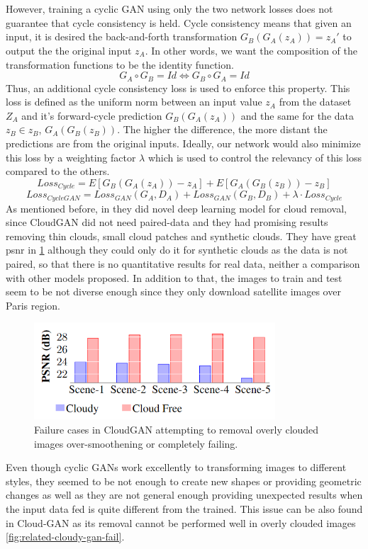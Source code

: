 \documentclass[11pt, a4paper]{article}
\begin{document}
	\\
	\\
	However, training a cyclic GAN using only the two network losses does not guarantee that cycle consistency is held. Cycle consistency means that given an input, it is desired the back-and-forth transformation $G_B(G_A(z_A)) = z_A'$ to output the the original input $z_A$.  In other words, we want the composition of the transformation functions to be the identity function.
	\[G_A \circ G_B = Id \Longleftrightarrow G_B \circ G_A = Id\]
	Thus, an additional cycle consistency loss is used to enforce this property. This loss is defined as the uniform norm between an input value $z_A$ from the dataset $Z_A$ and it's forward-cycle prediction $G_B(G_A(z_A))$ and the same for the data $z_B \in z_B$, $G_A(G_B(z_B))$. The higher the difference, the more distant the predictions are from the original inputs. Ideally, our network would also minimize this loss by a weighting factor $\lambda$ which is used to control the relevancy of this loss compared to the others.
	\[Loss_{Cycle} = E[G_B(G_A(z_A)) - z_A] + E[G_A(G_B(z_B)) - z_B] \] %
	\[Loss_{CycleGAN} = Loss_{GAN}(G_A, D_A) + Loss_{GAN}(G_B, D_B) + \lambda \cdot Loss_{Cycle}\]
	As mentioned before, in \cite{cloud-gan} they did novel deep learning model for cloud removal, since CloudGAN did not need paired-data and they had promising results removing thin clouds, small cloud patches and synthetic clouds. They have great \gls{psnr} in \ref{fig:related-cycle-psnr} although they could only do it for synthetic clouds as the data is not paired, so that there is no quantitative results for real data, neither a comparison with other models proposed. In addition to that, the images to train and test seem to be not diverse enough since they only download satellite images over Paris region.
	\begin{figure}[H]
		\centering
		\includegraphics[width=9cm]{imgs/relatedwork/cycle-gan-psnr.png}
		\caption{Failure cases in CloudGAN attempting to removal overly clouded images over-smoothening or completely failing.}
		\label{fig:related-cycle-psnr}
	\end{figure}
	Even though cyclic GANs work excellently to transforming images to different styles, they seemed to be not enough to create new shapes or providing geometric changes as well as they are not general enough providing unexpected results when the input data fed is quite different from the trained. This issue can be also found in Cloud-GAN as its removal cannot be performed well in overly clouded images \ref{fig:related-cloudy-gan-fail}.
\end{document}
